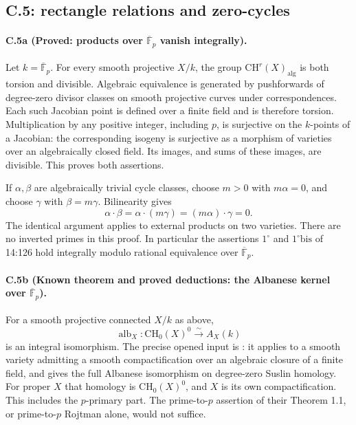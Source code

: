 \subsection{C.5: rectangle relations and zero-cycles}

\paragraph{C.5a (Proved: products over $\overline{\mathbb F}_p$ vanish integrally).}
Let $k=\overline{\mathbb F}_p$. For every smooth projective $X/k$,
the group $\mathrm{CH}^r(X)_{\mathrm{alg}}$ is both torsion and
divisible. Algebraic equivalence is generated by pushforwards of
degree-zero divisor classes on smooth projective curves under
correspondences. Each such Jacobian point is defined over a finite
field and is therefore torsion. Multiplication by any positive
integer, including $p$, is surjective on the $k$-points of a Jacobian:
the corresponding isogeny is surjective as a morphism of varieties
over an algebraically closed field. Its images, and sums of these
images, are divisible. This proves both assertions.

If $\alpha,\beta$ are algebraically trivial cycle classes, choose
$m>0$ with $m\alpha=0$, and choose $\gamma$ with $\beta=m\gamma$.
Bilinearity gives
\[
 \alpha\cdot\beta=\alpha\cdot(m\gamma)=(m\alpha)\cdot\gamma=0.
\]
The identical argument applies to external products on two varieties.
There are no inverted primes in this proof. In particular the
assertions $1^\circ$ and $1^\circ\mathrm{bis}$ of 14:126 hold integrally
modulo rational equivalence over $\overline{\mathbb F}_p$.

\paragraph{C.5b (Known theorem and proved deductions: the Albanese kernel over
$\overline{\mathbb F}_p$).}
For a smooth projective connected $X/k$ as above,
\[
 \operatorname{alb}_X:\mathrm{CH}_0(X)^0\xrightarrow{\sim}A_X(k)
\]
is an integral isomorphism. The precise opened input is
\citet[Theorem 1.2]{cySpiessSzamuely2003}: it applies to a smooth
variety admitting a smooth compactification over an algebraic
closure of a finite field, and gives the full Albanese isomorphism
on degree-zero Suslin homology. For proper $X$ that homology is
$\mathrm{CH}_0(X)^0$, and $X$ is its own compactification. This includes
the $p$-primary part. The prime-to-$p$ assertion of their Theorem 1.1,
or prime-to-$p$ Rojtman alone, would not suffice.

